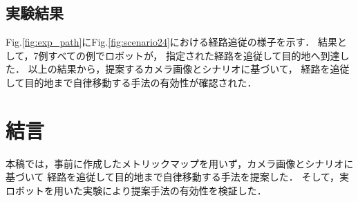 \documentclass{sice-si}
\begin{document}


\subsection{実験結果}
Fig.\ref{fig:exp_path}にFig.\ref{fig:scenario24}における経路追従の様子を示す．
結果として，7例すべての例でロボットが，
指定された経路を追従して目的地へ到達した．
以上の結果から，提案するカメラ画像とシナリオに基づいて，
経路を追従して目的地まで自律移動する手法の有効性が確認された．


\section{結言}
本稿では，事前に作成したメトリックマップを用いず，カメラ画像とシナリオに基づいて
経路を追従して目的地まで自律移動する手法を提案した．
そして，実ロボットを用いた実験により提案手法の有効性を検証した．
\end{document}
